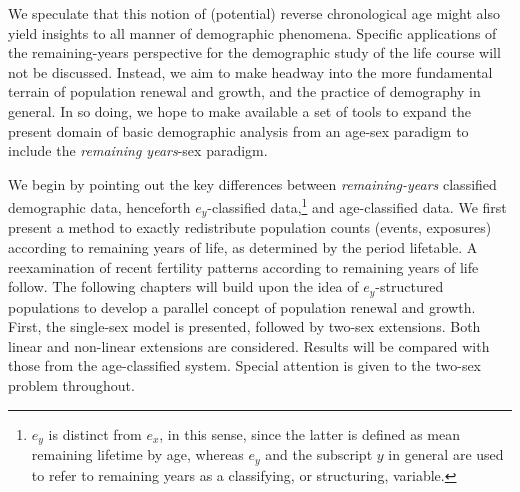 We speculate that this notion of (potential) reverse chronological age might
also yield insights to all manner of demographic phenomena. Specific
applications of the remaining-years perspective for the demographic study 
of the life course will not be discussed. Instead, we aim to make headway into 
the more fundamental terrain of population renewal and growth, and the 
practice of demography in general.
In so doing, we hope to make available a set of tools to expand the present
domain of basic demographic analysis from an age-sex paradigm to include the
\textit{remaining years}-sex paradigm.

We begin by pointing out the key differences
between \textit{remaining-years} classified demographic data,
henceforth $e_y$-classified data,\footnote{$e_y$ is distinct from $e_x$, in
this sense, since the latter is defined as mean remaining lifetime by age,
whereas $e_y$ and the subscript $y$ in general are used to refer to
remaining years as a classifying, or structuring, variable.} and age-classified
data. We first present a method to exactly redistribute population 
counts (events, exposures) according to remaining years of life, as determined
by the period lifetable. A reexamination of recent fertility patterns according
to remaining years of life follow. The following chapters will build upon 
the idea of $e_y$-structured populations
to develop a parallel concept of population renewal and growth. First, the
single-sex model is presented, followed by two-sex extensions. Both linear and
non-linear extensions are considered. Results will be compared with those
from the age-classified system. Special attention is given to the two-sex
problem throughout.


